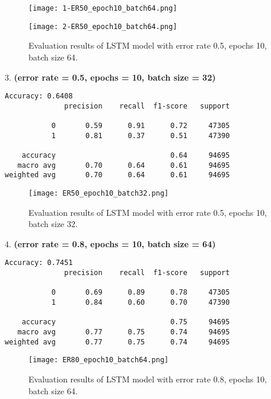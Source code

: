 \begin{figure}[h!]
    \centering
    \texttt{[image: 1-ER50\_epoch10\_batch64.png]}
    \label{fig:lstm_results_0.5_10_64-1}
\end{figure}
\begin{figure}[h!]
    \centering
    \texttt{[image: 2-ER50\_epoch10\_batch64.png]}
    \caption{Evaluation results of LSTM model with error rate 0.5, epochs 10, batch size 64.}
    \label{fig:lstm_results_0.5_10_64-2}
\end{figure}

3. \textbf{(error rate = 0.5, epochs = 10, batch size = 32)}
\begin{verbatim}
Accuracy: 0.6408
              precision    recall  f1-score   support

           0       0.59      0.91      0.72     47305
           1       0.81      0.37      0.51     47390

    accuracy                           0.64     94695
   macro avg       0.70      0.64      0.61     94695
weighted avg       0.70      0.64      0.61     94695
\end{verbatim}

\begin{figure}[h!]
    \centering
    \texttt{[image: ER50\_epoch10\_batch32.png]}
    \caption{Evaluation results of LSTM model with error rate 0.5, epochs 10, batch size 32.}
    \label{fig:lstm_results_0.5_10_32}
\end{figure}

4. \textbf{(error rate = 0.8, epochs = 10, batch size = 64)}
\begin{verbatim}
Accuracy: 0.7451
              precision    recall  f1-score   support

           0       0.69      0.89      0.78     47305
           1       0.84      0.60      0.70     47390

    accuracy                           0.75     94695
   macro avg       0.77      0.75      0.74     94695
weighted avg       0.77      0.75      0.74     94695
\end{verbatim}

\begin{figure}[h!]
    \centering
    \texttt{[image: ER80\_epoch10\_batch64.png]}
    \caption{Evaluation results of LSTM model with error rate 0.8, epochs 10, batch size 64.}
    \label{fig:lstm_results_0.8_10_64}
\end{figure}

